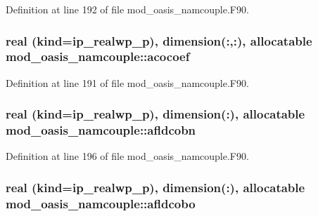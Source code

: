 Definition at line 192 of file mod\+\_\+oasis\+\_\+namcouple.\+F90.

\hypertarget{classmod__oasis__namcouple_a115cdfe0e05679107363605a992c6386}{
\subsubsection[{acocoef}]{\setlength{\rightskip}{0pt plus 5cm}real (kind=ip\+\_\+realwp\+\_\+p), dimension(\+:,\+:), allocatable mod\+\_\+oasis\+\_\+namcouple\+::acocoef\hspace{0.3cm}{\ttfamily [private]}}}\label{classmod__oasis__namcouple_a115cdfe0e05679107363605a992c6386}


Definition at line 191 of file mod\+\_\+oasis\+\_\+namcouple.\+F90.

\hypertarget{classmod__oasis__namcouple_a207709166cd4d719d65d76e6c043fd6c}{
\subsubsection[{afldcobn}]{\setlength{\rightskip}{0pt plus 5cm}real (kind=ip\+\_\+realwp\+\_\+p), dimension(\+:), allocatable mod\+\_\+oasis\+\_\+namcouple\+::afldcobn\hspace{0.3cm}{\ttfamily [private]}}}\label{classmod__oasis__namcouple_a207709166cd4d719d65d76e6c043fd6c}


Definition at line 196 of file mod\+\_\+oasis\+\_\+namcouple.\+F90.

\hypertarget{classmod__oasis__namcouple_aa9d178659282698ffb6c186ff48bed3c}{
\subsubsection[{afldcobo}]{\setlength{\rightskip}{0pt plus 5cm}real (kind=ip\+\_\+realwp\+\_\+p), dimension(\+:), allocatable mod\+\_\+oasis\+\_\+namcouple\+::afldcobo\hspace{0.3cm}{\ttfamily [private]}}}\label{classmod__oasis__namcouple_aa9d178659282698ffb6c186ff48bed3c}


